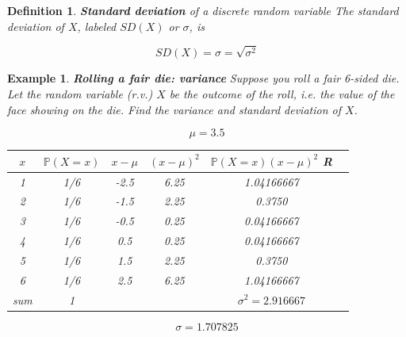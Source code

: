 \documentclass[12pt]{amsart}
\newtheorem{definition}[theorem]{Definition}
\newtheorem{example}[theorem]{Example}
\begin{document}
{\begin{definition}{\textbf{Standard deviation} of a discrete random variable} \newline
The standard deviation of $X$, labeled $SD(X)$ or $\sigma$, is 

\color{blue}
$$ SD(X) = \sigma = \sqrt{\sigma^2}$$
\color{black}

\end{definition}




\begin{example}  \textbf{Rolling a fair die: variance} \newline
Suppose you roll a fair 6-sided die. Let the random variable (r.v.) $X$ be the outcome of the roll, i.e. the value of the face showing on the die.  \newline
Find the variance and standard deviation of $X$.



\vspace{1cm}

\color{blue}

$$\mu = 3.5$$

\vspace{1cm}
\begin{tabular}{| c | c | c | c | c | c |}
  \hline                       
  $x$ & $\mathbb{P}(X=x)$ &  $x - \mu$ & $(x - \mu)^2$ & $\mathbb{P}(X=x)(x - \mu)^2$  R\\
   \hline     
  1 & 1/6  & -2.5 &  6.25 & 1.04166667\\
  2 & 1/6    & -1.5 & 2.25 &  0.3750\\
  3 & 1/6    & -0.5 &  0.25 & 0.04166667\\
  4 & 1/6    & 0.5 & 0.25 &  0.04166667\\
  5 & 1/6   & 1.5   &  2.25 & 0.3750\\
  6 & 1/6    &2.5 & 6.25 & 1.04166667\\
   \hline   
   sum & 1 &    &  & $\sigma^2 = 2.916667$\\
  \hline  
\end{tabular}
\vspace{1cm}
$$\sigma =1.707825 $$



\end{example}}
\end{document}

